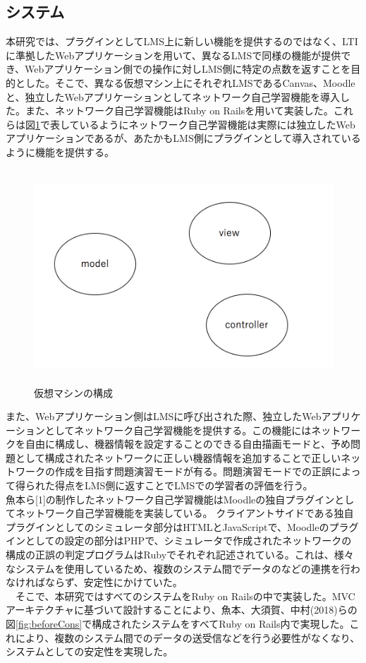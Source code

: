 \subsection{システム}
\label{tag:function}
本研究では、プラグインとしてLMS上に新しい機能を提供するのではなく、LTIに準拠したWebアプリケーションを用いて、異なるLMSで同様の機能が提供でき、Webアプリケーション側での操作に対しLMS側に特定の点数を返すことを目的とした。そこで、異なる仮想マシン上にそれぞれLMSであるCanvas、Moodleと、独立したWebアプリケーションとしてネットワーク自己学習機能を導入した。また、ネットワーク自己学習機能はRuby on Railsを用いて実装した。これらは図\ref{fig:virtualMachine}で表しているようにネットワーク自己学習機能は実際には独立したWebアプリケーションであるが、あたかもLMS側にプラグインとして導入されているように機能を提供する。

\begin{figure}[htbp]
  \begin{center}
    \includegraphics[clip,width=12.0cm,height=8.0cm]{img/virtualMachine.png}
    \caption{仮想マシンの構成}
    \label{fig:virtualMachine}
  \end{center}
\end{figure}



また、Webアプリケーション側はLMSに呼び出された際、独立したWebアプリケーションとしてネットワーク自己学習機能を提供する。この機能にはネットワークを自由に構成し、機器情報を設定することのできる自由描画モードと、予め問題として構成されたネットワークに正しい機器情報を追加することで正しいネットワークの作成を目指す問題演習モードが有る。問題演習モードでの正誤によって得られた得点をLMS側に返すことでLMSでの学習者の評価を行う。\\
魚本ら[1]の制作したネットワーク自己学習機能はMoodleの独自プラグインとしてネットワーク自己学習機能を実装している。
クライアントサイドである独自プラグインとしてのシミュレータ部分はHTMLとJavaScriptで、Moodleのプラグインとしての設定の部分はPHPで、シミュレータで作成されたネットワークの構成の正誤の判定プログラムはRubyでそれぞれ記述されている。これは、様々なシステムを使用しているため、複数のシステム間でデータのなどの連携を行わなければならず、安定性にかけていた。\\
　そこで、本研究ではすべてのシステムをRuby on Railsの中で実装した。MVCアーキテクチャに基づいて設計することにより、魚本、大須賀、中村(2018)らの図\ref{fig:beforeCons}で構成されたシステムをすべてRuby on Rails内で実現した。これにより、複数のシステム間でのデータの送受信などを行う必要性がなくなり、システムとしての安定性を実現した。
